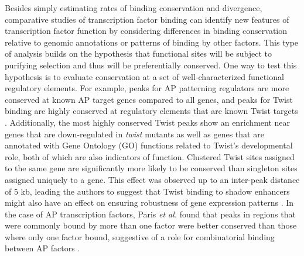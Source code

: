 Besides simply estimating rates of binding conservation and divergence, comparative studies of transcription factor binding can identify new features of transcription factor function by considering differences in binding conservation relative to genomic annotations or patterns of binding by other factors. This type of analysis builds on the hypothesis that functional sites will be subject to purifying selection and thus will be preferentially conserved. One way to test this hypothesis is to evaluate conservation at a set of well-characterized functional regulatory elements. For example, peaks for AP patterning regulators are more conserved at known AP target genes compared to all genes, and peaks for Twist binding are highly conserved at regulatory elements that are known Twist targets \citep{bradley_binding_2010,he_high_2011,paris_extensive_2013}. Additionally, the most highly conserved Twist peaks show an enrichment near genes that are down-regulated in \emph{twist} mutants as well as genes that are annotated with Gene Ontology (GO) functions related to Twist's developmental role, both of which are also indicators of function. Clustered Twist sites assigned to the same gene are significantly more likely to be conserved than singleton sites assigned uniquely to a gene. This effect was observed up to an inter-peak distance of 5 kb, leading the authors to suggest that Twist binding to shadow enhancers might also have an effect on ensuring robustness of gene expression patterns \citep{he_high_2011}. In the case of AP transcription factors, Paris \emph{et al.} found that peaks in regions that were commonly bound by more than one factor were better conserved than those where only one factor bound, suggestive of a role for combinatorial binding between AP factors \citep{paris_extensive_2013}.


